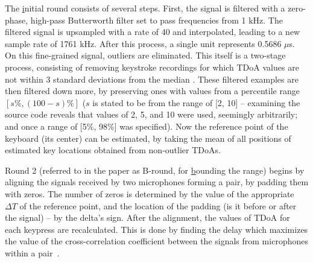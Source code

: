 \documentclass[../main.tex]{subfiles}
\begin{document}
The \underline{i}nitial round consists of several steps.
First, the signal is filtered with a zero-phase, high-pass Butterworth filter
\cite{aremu2013-butterwotrth-filter} set to pass frequencies from 1 kHz. 
The filtered signal is upsampled with a rate of 40 and interpolated,
leading to a new sample rate of 1761 kHz.
After this process, a single unit represents 0.5686 $\mu$s. 
On this fine-grained signal, outliers are eliminated.
This itself is a two-stage process, consisting of removing keystroke recordings for which
TDoA values are not within 3 standard deviations from the median 
\cite{leys2013detecting_outliers}.  These filtered examples
are then filtered down more, by preserving ones with values from
a percentile range $[s\%, (100-s)\%]$ ($s$ is stated to be from the
range of [2, 10] -- examining the source code reveals that values
of 2, 5, and 10 were used, seemingly arbitrarily;
and once a range of [5\%, 98\%] was specified).
Now the reference point of the keyboard (its center) can be estimated,
by taking the mean of all positions of estimated key locations obtained
from non-outlier TDoAs.

Round 2 (referred to in the paper as B-round, for \underline{b}ounding the range)
begins by aligning the signals received by two microphones forming a pair, by
padding them with zeros. The number of zeros is determined by the value of the
appropriate $\Delta T$ of the reference point, and the location of the padding
(is it before or after the signal) -- by the delta's sign. After the alignment,
the values of TDoA for each keypress are recalculated. This is done by finding the
delay which maximizes the value of the cross-correlation coefficient between the
signals from microphones within a pair~\cite{acoustic-time-delay2010}.
\end{document}
